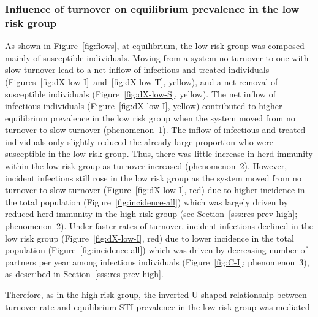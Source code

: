 \subsubsection{Influence of turnover on equilibrium prevalence in the low risk group}
\label{sss:res-prev-low}
As shown in Figure~\ref{fig:flows}, at equilibrium, the low risk group was
composed mainly of susceptible individuals.
Moving from a system no turnover to one with slow turnover
lead to a net inflow of infectious and treated individuals
(Figures~\ref{fig:dX-low-I}~and~\ref{fig:dX-low-T}, yellow),
and a net removal of susceptible individuals
(Figure~\ref{fig:dX-low-S}, yellow).
The net inflow of infectious individuals
(Figure~\ref{fig:dX-low-I}, yellow) contributed to
higher equilibrium prevalence in the low risk group
when the system moved from no turnover to slow turnover
(phenomenon~1).
The inflow of infectious and treated individuals
only slightly reduced the already large proportion who were susceptible
in the low risk group.
Thus, there was little increase in herd immunity within the low risk group
as turnover increased
(phenomenon~2).
However, incident infections still rose in the low risk group
as the system moved from no turnover to slow turnover
(Figure~\ref{fig:dX-low-I}, red)
due to higher incidence in the total population (Figure~\ref{fig:incidence-all})
which was largely driven by
reduced herd immunity in the high risk group
(see Section~\ref{sss:res-prev-high}; phenomenon~2).
Under faster rates of turnover,
incident infections declined in the low risk group
(Figure~\ref{fig:dX-low-I}, red)
due to lower incidence in the total population
(Figure~\ref{fig:incidence-all})
which was driven by
decreasing number of partners per year among infectious individuals
(Figure~\ref{fig:C-I}; phenomenon~3),
as described in Section~\ref{sss:res-prev-high}.
\par
Therefore, as in the high risk group,
the inverted U-shaped relationship between turnover rate
and equilibrium STI prevalence in the low risk group was mediated
